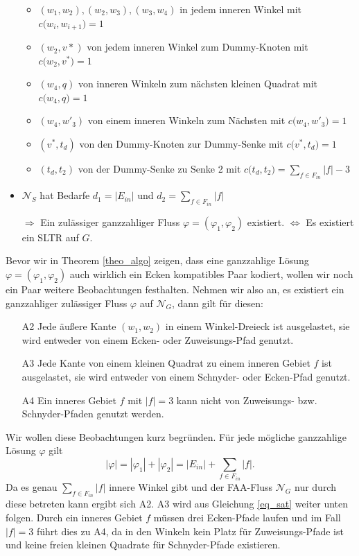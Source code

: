 \begin{network}[SLTR]
\begin{itemize}
\begin{itemize}
		\item $(w_1,w_2),(w_2,w_3),(w_3,w_4)$ in jedem inneren Winkel mit $c\big(w_i,w_{i+1}\big) = 1$
		\item $(w_2,v*)$ von jedem inneren Winkel zum Dummy-Knoten mit $c\big(w_2,v^*\big) = 1$
		\item $(w_4,q)$ von inneren Winkeln zum nächsten kleinen Quadrat mit $c\big(w_4,q\big) = 1$
		\item $(w_4,w'_3)$ von einem inneren Winkeln zum Nächsten mit $c\big(w_4,w'_3\big) = 1$
		\item $(v^*,t_d)$ von den Dummy-Knoten zur Dummy-Senke mit $c\big(v^*,t_d\big) = 1$
		\item $(t_d,t_2)$ von der Dummy-Senke zu Senke 2 mit $c\big(t_d,t_2\big) = \sum_{f \in F_{in}}|f|-3$
		\end{itemize}
	\item $\mathcal{N}_S$ hat Bedarfe $d_1=|E_{in}|$ und $d_2 = \sum_{f \in F_{in}}|f|$
	\item [$\Rightarrow$] Ein zulässiger ganzzahliger Fluss $\varphi = (\varphi_1,\varphi_2)$ existiert. $\Leftrightarrow$ Es existiert ein SLTR  auf $G$.
	\end{itemize}
\end{network}	

Bevor wir in Theorem \ref{theo_algo} zeigen, dass eine ganzzahlige Lösung $\varphi=(\varphi_1,\varphi_2)$ auch wirklich ein Ecken kompatibles Paar kodiert, wollen wir noch ein Paar weitere Beobachtungen festhalten. Nehmen wir also an, es existiert ein ganzzahliger zulässiger Fluss $\varphi$ auf $\mathcal{N}_G$, dann gilt für diesen:
\begin{itemize}
\item [A2] Jede äußere Kante $(w_1,w_2)$ in einem Winkel-Dreieck ist ausgelastet, sie wird entweder von einem Ecken- oder Zuweisungs-Pfad genutzt.
\item [A3] Jede Kante von einem kleinen Quadrat zu einem inneren Gebiet $f$ ist ausgelastet, sie wird entweder von einem Schnyder- oder Ecken-Pfad genutzt.
\item [A4] Ein inneres Gebiet $f$ mit $|f|=3$ kann nicht von Zuweisungs- bzw. Schnyder-Pfaden genutzt werden.
\end{itemize}

Wir wollen diese Beobachtungen kurz begründen. Für jede mögliche ganzzahlige Lösung $\varphi$ gilt $$|\varphi|=|\varphi_1|+|\varphi_2| = |E_{in}| + \sum_{f \in F_{in}} |f|.$$
Da es genau $\sum_{f \in F_{in}} |f|$ innere Winkel gibt und der FAA-Fluss $\mathcal{N}_G$ nur durch diese betreten kann ergibt sich A2. A3 wird aus Gleichung \ref{eq_sat} weiter unten folgen. Durch ein inneres Gebiet $f$ müssen drei Ecken-Pfade laufen und im Fall $|f|=3$ führt dies zu A4, da in den Winkeln kein Platz für Zuweisungs-Pfade ist und keine freien kleinen Quadrate für Schnyder-Pfade existieren.


